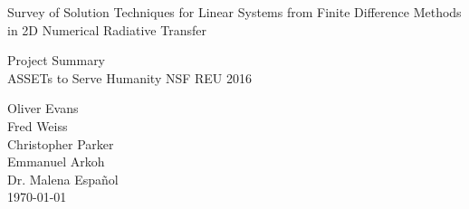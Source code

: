 \documentclass[10pt]{article}
\begin{document}
\null

\thispagestyle{empty}
\addtocounter{page}{-1}

\begin{center}
    \begin{sffamily}
	\begin{bfseries}
	    \null
	    \vfill
		\Huge{Survey of Solution Techniques for Linear Systems from Finite Difference Methods in 2D Numerical Radiative Transfer}

	    \vspace{20pt}
	    \LARGE{Project Summary} \\
		\LARGE{ASSETs to Serve Humanity NSF REU 2016} \\
	    \vspace{20pt}
    \begin{Large}
		Oliver Evans \\
		Fred Weiss \\
		Christopher Parker \\
		Emmanuel Arkoh \\[1em]

		Dr. Malena Espa\~nol \\
	\vspace{20pt}
	\today
    \end{Large}
	\end{bfseries}
    \end{sffamily}
    \vspace{30pt}

    \null
    \vfill
    \vfill
    \null
\end{center}
\pagebreak


\renewcommand{\arraystretch}{1.5}
\end{document}
